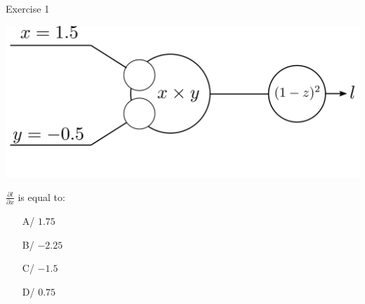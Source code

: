 \documentclass[xcolor=pdftex,dvipsnames,table,mathserif]{beamer}
\begin{document}
\begin{frame}{Exercise 1}

  \includegraphics[width=\textwidth]{bp_2_1_neuron_exo.png}


  $\frac{\partial l}{\partial x}$ is equal to:

    \begin{itemize}
  \item[A/] $1.75$
  \item[B/] $-2.25$
  \item[C/] $-1.5$
  \item[D/] $0.75$
  \end{itemize}





\end{frame}
\end{document}
